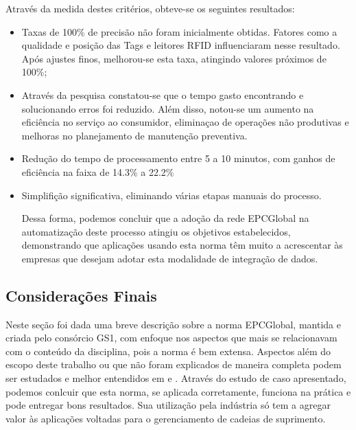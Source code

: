 	Através da medida destes critérios, obteve-se os seguintes resultados:
	\begin{itemize}
		\item Taxas de 100\% de precisão não foram inicialmente obtidas. Fatores como a qualidade e posição das Tags e leitores RFID influenciaram nesse resultado. Após ajustes finos, melhorou-se esta taxa, atingindo valores próximos de 100\%;
		\item Através da pesquisa constatou-se que o tempo gasto encontrando e solucionando erros foi reduzido. Além disso, notou-se um aumento na eficiência no serviço ao consumidor, eliminaçao de operações não produtivas e melhoras no planejamento de manutenção preventiva.
		\item Redução do tempo de processamento entre 5 a 10 minutos, com ganhos de eficiência na faixa de 14.3\% a 22.2\% 
		\item Simplifição significativa, eliminando várias etapas manuais do processo.
		
	Dessa forma, podemos concluir que a adoção da rede EPCGlobal na automatização deste processo atingiu os objetivos estabelecidos, demonstrando que aplicações usando esta norma têm muito a acrescentar às empresas que desejam adotar esta modalidade de integração de dados.
		
	\end{itemize} 
	
	
	\subsection{Considerações Finais}
	Neste seção foi dada uma breve descrição sobre a norma EPCGlobal, mantida e criada pelo consórcio GS1, com enfoque nos aspectos que mais se relacionavam com o conteúdo da disciplina, pois a norma é bem extensa. Aspectos além do escopo deste trabalho ou que não foram explicados de maneira completa podem ser estudados e melhor entendidos  em \cite{gs1} e \cite{gs1arc}. Através do estudo de caso apresentado, podemos conlcuir que esta norma, se aplicada corretamente, funciona na prática e pode entregar bons resultados. Sua utilização pela indústria só tem a agregar valor às aplicações voltadas para o gerenciamento de cadeias de suprimento.
	

%
%

		
%